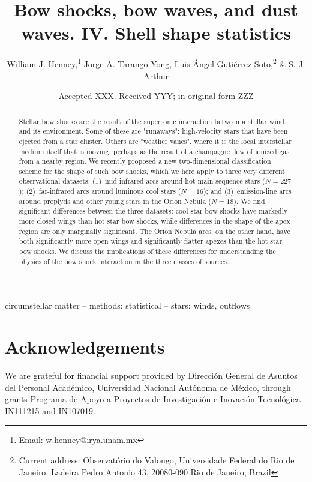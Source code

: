 \documentclass[useAMS, usenatbib, a4paper]{mnras}
\title[Bow shocks, bow waves, and dust waves. IV.]{Bow shocks, bow
  waves, and dust waves. IV. Shell shape statistics}
\author[Henney et al.]{
  William J. Henney,\thanks{Email: w.henney@irya.unam.mx}
  Jorge A. Tarango-Yong,
  Luis \'Angel Guti\'errez-Soto,\thanks{%
    Current address: Observatório do Valongo,
    Universidade Federal do Rio de Janeiro,
    Ladeira Pedro Antonio 43, 20080-090 Rio de Janeiro, Brazil}
  \& S. J. Arthur
  \\
  \AddressCRyA
}
\date{Accepted XXX. Received YYY; in original form ZZZ}
\begin{document}
\label{firstpage}
\pagerange{\pageref{firstpage}--\pageref{lastpage}}
\maketitle
\begin{abstract}
  Stellar bow shocks are the result of the supersonic interaction
  between a stellar wind and its environment.  Some of these are
  "runaways": high-velocity stars that have been ejected from a star
  cluster.  Others are "weather vanes", where it is the local
  interstellar medium itself that is moving, perhaps as the result of
  a champagne flow of ionized gas from a nearby \hii{} region.
  We recently proposed a new two-dimensional classification scheme for
  the shape of such bow shocks, which we here apply to three very
  different observational datasets: (1)~mid-infrared arcs
  around hot main-sequence stars (\(N = 227\)); (2)~far-infrared arcs
  around luminous cool stars (\(N = 16\)); and (3)~emission-line arcs
  around proplyds and other young stars in the Orion Nebula
  (\(N = 18\)).  We find significant differences between the three
  datasets: cool star bow shocks have markedly more closed wings than
  hot star bow shocks, while differences in the shape of the apex
  region are only marginally significant.  The Orion Nebula arcs, on
  the other hand, have both significantly more open wings and
  significantly flatter apexes than the hot star bow shocks.  We
  discuss the implications of these differences for understanding the
  physics of the bow shock interaction in the three classes of
  sources.
\end{abstract}

\begin{keywords}
  circumstellar matter -- methods: statistical -- stars: winds, outflows
\end{keywords}






\section*{Acknowledgements}
We are grateful for financial support provided by Dirección General de
Asuntos del Personal Académico, Universidad Nacional Autónoma de
México, through grants Programa de Apoyo a Proyectos de Investigación
e Inovación Tecnológica IN111215 and IN107019.  



\appendix



\bsp	%
\label{lastpage}
\end{document}
